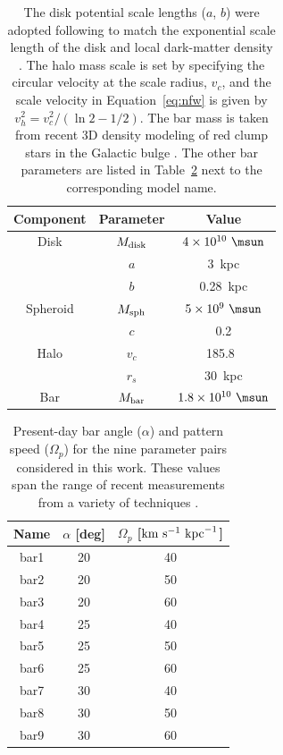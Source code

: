 \documentclass[numberedappendix]{emulateapj}
\begin{document}
\begin{table}[ht]
\begin{center}
	\begin{tabular}{ c | c | c }
	         \toprule
	         Component & Parameter & Value \\\toprule
		Disk & $M_{\rm disk}$ & $4 \times 10^{10}~\msun$ \\
		& $a$ & 3~{\rm kpc}\\
		& $b$ & 0.28~{\rm kpc} \\\midrule
		Spheroid & $M_{\rm sph}$ & $5 \times 10^{9}~\msun$ \\
		& $c$ & 0.2 \\\midrule
	         Halo & $v_c$ & 185.8~\kms\\
		& $r_s$ & 30~kpc \\
		Bar & $M_{\rm bar}$ & $1.8 \times 10^{10}~\msun$ \\
		\bottomrule
		\end{tabular}
	\caption{The disk potential scale lengths ($a$, $b$) were adopted following \citep{bovy15-galpy} to match the exponential scale length of the disk \citep{bovyrix13} and local dark-matter density \citep[e.g.,][]{bovytremaine12}. The halo mass scale is set by specifying the circular velocity at the scale radius, $v_c$, and the scale velocity in Equation~\ref{eq:nfw} is given by $v_h^2 = v_c^2 / (\ln2 - 1/2)$. The bar mass is taken from recent 3D density modeling of red clump stars in the Galactic bulge \citep{portail15}. The other bar parameters are listed in Table~\ref{tbl:bar-specific} next to the corresponding model name. \label{tbl:potential-params-barred}}
\end{center}
\end{table}

\begin{table}[ht]
\begin{center}
	\begin{tabular}{ c | c | c }
	         \toprule
	         Name & $\alpha$ [deg] & $\Omega_p$ [${\rm km}~{\rm s}^{-1}~{\rm kpc}^{-1}$] \\\toprule
		bar1 & 20 & 40\\
		bar2 & 20 & 50\\
		bar3 & 20 & 60\\
		bar4 & 25 & 40\\
		bar5 & 25 & 50\\
		bar6 & 25 & 60\\
		bar7 & 30 & 40\\
		bar8 & 30 & 50\\
		bar9 & 30 & 60\\
		\bottomrule
		\end{tabular}
	\caption{Present-day bar angle ($\alpha$) and pattern speed ($\Omega_p$) for the nine parameter pairs considered in this work. These values span the range of recent measurements from a variety of techniques \citep{dwek95, wang12,wang13,wegg13}. \label{tbl:bar-specific}}
\end{center}
\end{table}
\end{document}
